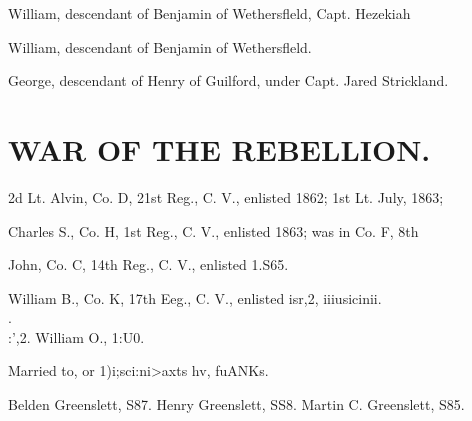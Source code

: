 \documentclass{book}
\begin{document}
William, descendant of Benjamin of Wethersfleld, Capt. Hezekiah 

William, descendant of Benjamin of Wethersfleld. 







George, descendant of Henry of Guilford, under Capt. Jared Strickland. 







\section{WAR OF THE REBELLION.}

2d Lt. Alvin, Co. D, 21st Reg., C. V., enlisted 1862; 1st Lt. July, 1863; 


Charles S., Co. H, 1st Reg., C. V., enlisted 1863; was in Co. F, 8th 





John, Co. C, 14th Reg., C. V., enlisted 1.S65. 






William B., Co. K, 17th Eeg., C. V., enlisted isr,2, iiiusicinii. \\.\\:',2. 
William O., 1:U0. 

Married to, or 1)i;sci:ni>axts hv, fuANKs. 

Belden Greenslett, S87. 
Henry Greenslett, SS8. 
Martin C. Greenslett, S85. 
\end{document}
